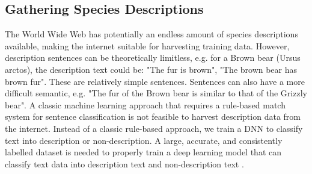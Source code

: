 \documentclass[a4paper, 12pt, oneside]{book} %
\begin{document}
\subsection{Gathering Species Descriptions} \label{par:dataset}
The World Wide Web has potentially an endless amount of species descriptions available, making the internet suitable for harvesting training data.
However, description sentences can be theoretically limitless, e.g. for a Brown bear (Ursus arctos), the description text could be: "The fur is brown", "The brown bear has brown fur".
These are relatively simple sentences.
Sentences can also have a more difficult semantic, e.g. "The fur of the Brown bear is similar to that of the Grizzly bear".
A classic machine learning approach that requires a rule-based match system for sentence classification is not feasible to harvest description data from the internet.
Instead of a classic rule-based approach, we train a DNN to classify text into description or non-description.
A large, accurate, and consistently labelled dataset is needed to properly train a deep learning model that can classify text data into description text and non-description text \autocite{munappy_data_2019}.
\end{document}

